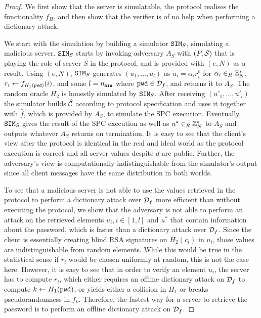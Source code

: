 \begin{proof}
  We first show that the server is simulatable, \ie the protocol realises the functionality $f_\Pi$, and then show that the verifier \ver is of no help when performing a dictionary attack.
  
  We start with the simulation by building a simulator $\mathtt{SIM}_S$, simulating a malicious server.
  $\mathtt{SIM}_S$ starts by invoking adversary $A_S$ with $(P, \mathcal{S})$ that is playing the role of server $S$ in the protocol, and is provided with $(e,N)$ as a result.
  Using $(e,N)$, $\mathtt{SIM}_S$ generates $(u_1, \dots, u_l)$ as $u_i=\alpha_i r_i^e$ for $\alpha_i\in_R \mathbb{Z}^\ast_N$, $r_i\gets f_{H_1(\mathtt{pwd})}(i)$, and some $l={n_\mathtt{min}}$ where $\mathtt{pwd}\in\mathcal{D}_f$, and returns it to $A_S$.
  The random oracle $H_2$ is honestly simulated by $\mathtt{SIM}_S$.
  After receiving $(u'_1, \dots, u'_l)$ the simulator builds $\hat{\mathcal{C}}$ according to protocol specification and uses it together with $\hat{f}$, which is provided by $A_S$, to simulate the \ac{SPC} execution.
  Eventually, $\mathtt{SIM}_S$ gives the result of the \ac{SPC} execution as well as $u^\ast\in_R\mathbb{Z}^\ast_N$ to $A_S$ and outputs whatever $A_S$ returns on termination.
  It is easy to see that the client's view after the protocol is identical in the real and ideal world as the protocol execution is correct and all server values despite $d$ are public.
  Further, the adversary's view is computationally indistinguishable from the simulator's output since all client messages have the same distribution in both worlds.
  
  To see that a malicious server is not able to use the values retrieved in the protocol to perform a dictionary attack over $\mathcal{D}_f$ more efficient than without executing the protocol, \ie we show that the adversary is not able to perform an attack on the retrieved elements $u_i, i\in[1,l]$ and $u^\ast$ that contain information about the password, which is faster than a dictionary attack over $\mathcal{D}_f$.
  Since the client is essentially creating blind RSA signatures on $H_2(c_i)$ in $u_i$, those values are indistinguishable from random elements.
  While this would be true in the statistical sense if $r_i$ would be chosen uniformly at random, this is not the case here.
  However, it is easy to see that in order to verify an element $u_i$, the server has to compute $r_i$, which either requires an offline dictionary attack on $\mathcal{D}_f$ to compute $k\gets H_1(\mathtt{pwd})$, or yields either a collision in $H_1$ or breaks pseudorandomness in $f_k$.
  Therefore, the fastest way for a server to retrieve the password is to perform an offline dictionary attack on $\mathcal{D}_f$.
  
\end{proof}

